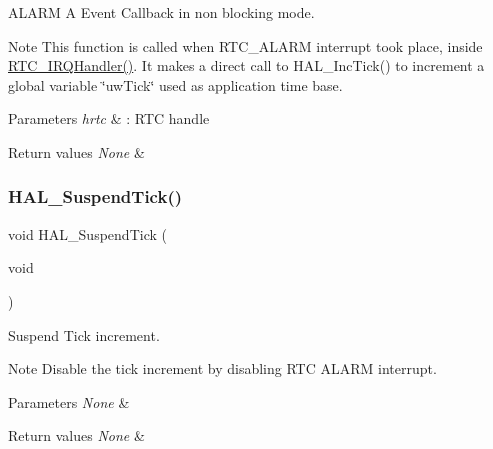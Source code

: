 A\+L\+A\+RM A Event Callback in non blocking mode. 

\begin{DoxyNote}{Note}
This function is called when R\+T\+C\+\_\+\+A\+L\+A\+RM interrupt took place, inside \hyperlink{group___h_a_l___time_base___r_t_c___alarm___template_gab86b9dd0d7b4eacfe38086e1fa4c2312}{R\+T\+C\+\_\+\+I\+R\+Q\+Handler()}. It makes a direct call to H\+A\+L\+\_\+\+Inc\+Tick() to increment a global variable \char`\"{}uw\+Tick\char`\"{} used as application time base. 
\end{DoxyNote}

\begin{DoxyParams}{Parameters}
{\em hrtc} & \+: R\+TC handle \\
\hline
\end{DoxyParams}

\begin{DoxyRetVals}{Return values}
{\em None} & \\
\hline
\end{DoxyRetVals}
\mbox{\label{group___h_a_l___time_base___r_t_c___alarm___template_gaaf651af2afe688a991c657f64f8fa5f9}} 
\subsubsection{\texorpdfstring{H\+A\+L\+\_\+\+Suspend\+Tick()}{HAL\_SuspendTick()}}
{\footnotesize\ttfamily void H\+A\+L\+\_\+\+Suspend\+Tick (\begin{DoxyParamCaption}\item[{void}]{ }\end{DoxyParamCaption})}



Suspend Tick increment. 

\begin{DoxyNote}{Note}
Disable the tick increment by disabling R\+TC A\+L\+A\+RM interrupt. 
\end{DoxyNote}

\begin{DoxyParams}{Parameters}
{\em None} & \\
\hline
\end{DoxyParams}

\begin{DoxyRetVals}{Return values}
{\em None} & \\
\hline
\end{DoxyRetVals}

